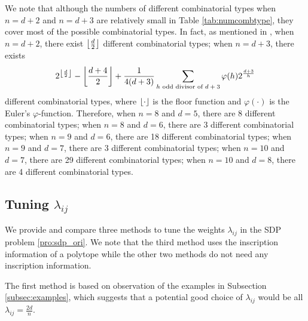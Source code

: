 \documentclass[smallextended, envcountsame]{svjour3}
\DeclarePairedDelimiter\floor{\lfloor}{\rfloor}
\begin{document}
    We note that although the numbers of different combinatorial types when $n=d+2$ and $n=d+3$ are relatively small in Table \ref{tab:numcombtype}, they cover most of the possible combinatorial types.  In fact, as mentioned in \cite{grunbaum2003convex}, when $n=d+2$, there exist $\floor*{\frac{d}{2}}$ different combinatorial types; when $n=d+3$, there exists 
    \begin{equation*}
        2^{\floor*{\frac{d}{2}}} - \floor*{\frac{d+4}{2}} + \frac{1}{4(d+3)}\sum\limits_{\text{$h$ odd divisor of $d+3$}}\varphi(h)2^{\frac{d+3}{h}}
    \end{equation*}
    different combinatorial types, where $\floor*{\cdot}$ is the floor function and $\varphi(\cdot)$ is the Euler's $\varphi$-function.  Therefore, when $n=8$ and $d=5$, there are 8 different combinatorial types; when $n=8$ and $d=6$, there are 3 different combinatorial types; when $n=9$ and $d=6$, there are 18 different combinatorial types; when $n=9$ and $d=7$, there are 3 different combinatorial types; when $n=10$ and $d=7$, there are 29 different combinatorial types; when $n=10$ and $d=8$, there are 4 different combinatorial types.


\subsection{Tuning $\lambda_{ij}$}\label{subsec:tunelmd}
    We provide and compare three methods to tune the weights $\lambda_{ij}$ in the SDP problem \eqref{pro:sdp_ori}.  We note that the third method uses the inscription information of a polytope while the other two methods do not need any inscription information.  

    The first method is based on observation of the examples in Subsection \ref{subsec:examples}, which suggests that a potential good choice of $\lambda_{ij}$ would be all $\lambda_{ij}=\frac{2d}{n}$.  
\end{document}
